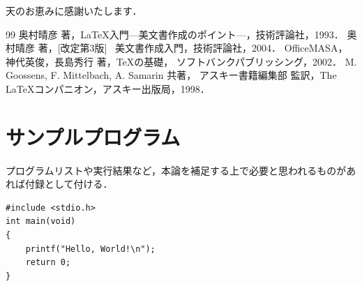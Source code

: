 \documentclass[11pt]{ujreport}
\begin{document}

\begin{acknowledgements}
 天のお恵みに感謝いたします．
\end{acknowledgements}


\begin{thebibliography}{99}
    奥村晴彦 著，\LaTeX 入門---美文書作成のポイント---，技術評論社，1993．
    奥村晴彦 著，[改定第3版] \LaTeXe~美文書作成入門，技術評論社，2004．
    OfficeMASA，神代英俊，長島秀行 著，\TeX の基礎，
    ソフトバンクパブリッシング，2002．
    M. Goossens, F. Mittelbach, A. Samarin 共著，
    アスキー書籍編集部 監訳，The \LaTeX コンパニオン，アスキー出版局，1998．
\end{thebibliography}


\appendix

\chapter{サンプルプログラム}
プログラムリストや実行結果など，本論を補足する上で必要と思われるものがあ
れば付録として付ける．

{
\footnotesize
\begin{verbatim}
#include <stdio.h>
int main(void)
{
    printf("Hello, World!\n");
    return 0;
}
\end{verbatim}
}

\end{document}
